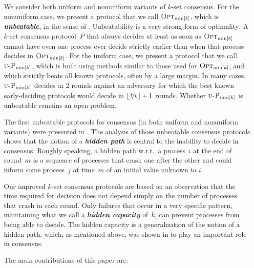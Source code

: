 \documentclass[11pt]{article}
\theoremstyle{definition}
\newcommand{\OptMink}{\mbox{$\mbox{\sc Opt}_{\min[k]}$}}
\newcommand{\defemph}[1]{\textbf{\textit{#1}}}
\newcommand{\tee}{\,\defemph{t}}
\newcommand{\UOptMink}{\mbox{$\mbox{\sc u-P}_{\min[k]}$}}
\begin{document}
We consider both uniform and nonuniform variants of $k$-set consensus. For the nonuniform case, we present a protocol
that we call
$\OptMink$,
which is \defemph{unbeatable}, in the sense of \cite{AYY-DISC}. Unbeatability is a very strong form of optimality: A $k$-set consensus protocol~$P$ that always decides at least as soon as $\OptMink$ cannot have even one process ever
decide
strictly earlier than
when that
process
decides
in $\OptMink$.
For the uniform case, we present
a protocol that we call
$\UOptMink$,
which is built using methods similar to those used for
$\OptMink$,
and which
strictly
beats
all known protocols, often by a large margin. In many cases, $\UOptMink$ decides in 2 rounds against an adversary for which the best known early-deciding protocols would decide in $\lfloor \nicefrac{\tee}{k} \rfloor+1$ rounds. Whether $\UOptMink$ is unbeatable remains an open problem.

The first unbeatable protocols for consensus (in both uniform and nonuniform variants) were presented in \cite{AYY-DISC}.
The analysis of those unbeatable consensus protocols
shows that the notion of a \defemph{hidden path} is central to the inability to decide in consensus.
Roughly speaking,
a hidden path w.r.t.\  a process~$i$ at the end of round~$m$ is a sequence
of processes that crash one after the other and
could inform
some process~$j$
at time~$m$ of an
initial
value
unknown to
$i$.

Our improved $k$-set consensus protocols are based on an observation that the time required for decision does not depend simply on the number of processes that crash in each round. Only failures that occur in a very specific
pattern, maintaining what we call a \defemph{hidden capacity} of~$k$, can prevent processes from being able to decide.
The hidden capacity is a generalization of the notion of a hidden path, which, as mentioned above,
was shown in \cite{AYY-DISC} to play
an important role in consensus.

The main contributions of this paper are:
\end{document}
